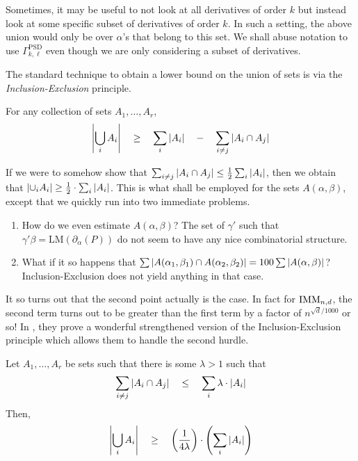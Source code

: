 \begin{remark*}
Sometimes, it may be useful to not look at all derivatives of order $k$ but instead look at some specific subset of derivatives of order $k$. 
In such a setting, the above union would only be over $\alpha$'s that belong to this set. 
We shall abuse notation to use $\Gamma^{\mathrm{PSD}}_{k,\ell}$ even though we are only considering a subset of derivatives. 
\end{remark*}

The standard technique to obtain a lower bound on the union of sets is via the \emph{Inclusion-Exclusion} principle. 

\begin{lemma}\label{lem:inc-exc}
For any collection of sets $A_1,\dots, A_r$,
\[
\left|\bigcup_i A_i\right| \quad \geq \quad \sum_{i} \left|A_i\right| \quad - \quad \sum_{i\neq j}\left|A_i\cap A_j\right|
\]
\end{lemma}

If we were to somehow show that $\sum_{i\neq j}\left|A_i\cap A_j\right| \leq \frac{1}{2}\sum_i \left|A_i\right|$, then we obtain that $\left|\cup_i A_i\right| \geq \frac{1}{2}\cdot \sum_i \left|A_i\right|$. 
This is what shall be employed for the sets $A(\alpha, \beta)$, except that we quickly run into two immediate problems. 

\begin{enumerate}
  \item How do we even estimate $A(\alpha, \beta)$? The set of $\gamma'$ such that $\gamma' \beta = \mathrm{LM}(\partial_\alpha(P))$ do not seem to have any nice combinatorial structure. 
  \item What if it so happens that $\sum \left|A(\alpha_1,\beta_1)\cap A(\alpha_2,\beta_2)\right| = 100 \sum \left|A(\alpha,\beta)\right|$? Inclusion-Exclusion does not yield anything in that case. 
\end{enumerate}


It so turns out that the second point actually is the case. 
In fact for $\mathrm{IMM}_{n,d}$, the second term turns out to be greater than the first term by a factor of $n^{\sqrt{d}/1000}$ or so! 
In \cite{KS14}, they prove a wonderful strengthened version of the Inclusion-Exclusion principle which allows them to handle the second hurdle. 

\begin{lemma}\label{lem:str-inc-exc}
Let $A_1,\dots, A_r$ be sets such that there is some $\lambda > 1$ such that
\[
\sum_{i\neq j} \left|A_i \cap A_j\right| \quad \leq \quad \sum_i \lambda \cdot \left|A_i\right|
\]
Then, 
\[
\left|\bigcup_i A_i\right| \quad \geq \quad \left(\frac{1}{4\lambda}\right) \cdot \left(\sum_i \left|A_i\right|\right)
\]
\end{lemma}

